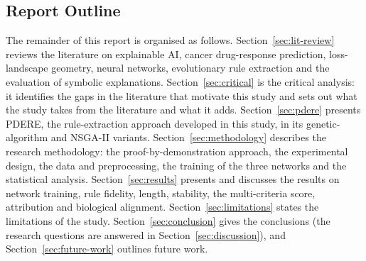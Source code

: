 \subsection{Report Outline}\label{sec:outline}
The remainder of this report is organised as follows. Section~\ref{sec:lit-review} reviews the literature on explainable AI, cancer drug-response prediction, loss-landscape geometry, neural networks, evolutionary rule extraction and the evaluation of symbolic explanations. Section~\ref{sec:critical} is the critical analysis: it identifies the gaps in the literature that motivate this study and sets out what the study takes from the literature and what it adds. Section~\ref{sec:pdere} presents PDERE, the rule-extraction approach developed in this study, in its genetic-algorithm and NSGA-II variants. Section~\ref{sec:methodology} describes the research methodology: the proof-by-demonstration approach, the experimental design, the data and preprocessing, the training of the three networks and the statistical analysis. Section~\ref{sec:results} presents and discusses the results on network training, rule fidelity, length, stability, the multi-criteria score, attribution and biological alignment. Section~\ref{sec:limitations} states the limitations of the study. Section~\ref{sec:conclusion} gives the conclusions (the research questions are answered in Section~\ref{sec:discussion}), and Section~\ref{sec:future-work} outlines future work.